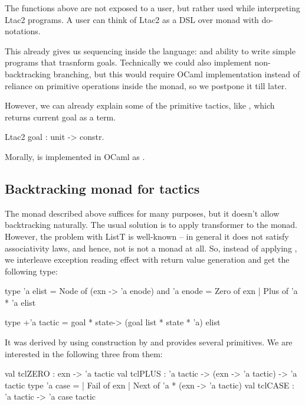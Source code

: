 The functions above are not exposed to a user, but rather used while interpreting Ltac2 programs.
A user can think of Ltac2 as a DSL over  monad with do-notations.

This already gives us sequencing inside the language:  and ability to write simple programs that trasnform goals.
Technically we could also implement non-backtracking branching, but this would require OCaml implementation instead of reliance on primitive operations inside the monad, so we postpone it till later.

However, we can already explain some of the primitive tactics, like , which returns current goal as a term.
\begin{coq}
  Ltac2 goal : unit -> constr.
\end{coq}\vspace{-1em}
Morally,  is implemented in OCaml as .

\subsection{Backtracking monad for tactics}
\label{sec:backtr-monad-tact}

The monad described above suffices for many purposes, but it doesn't allow backtracking naturally.
The usual solution is to apply  transformer to the monad.
However, the problem with ListT is well-known \cite{jones1993composing} -- in general it does not satisfy associativity laws, and hence, not is not a monad at all.
So, instead of applying , we interleave exception reading effect with return value generation and get the following type:
\begin{ocaml}
type 'a elist = Node of (exn -> 'a enode)
and 'a enode = Zero of exn | Plus of 'a * 'a elist

type +'a tactic = goal * state-> (goal list * state * 'a) elist
\end{ocaml}
It was derived by \citet{spiwackAbstractTypeConstructing2010} using construction by \citet{kiselyovBacktrackingInterleavingTerminating2005} and provides several primitives.
We are interested in the following three from them:
\begin{ocaml}
val tclZERO : exn -> 'a tactic
val tclPLUS : 'a tactic -> (exn -> 'a tactic) -> 'a tactic
type 'a case =
  | Fail of exn
  | Next of 'a * (exn -> 'a tactic)
val tclCASE : 'a tactic -> 'a case tactic
\end{ocaml}

